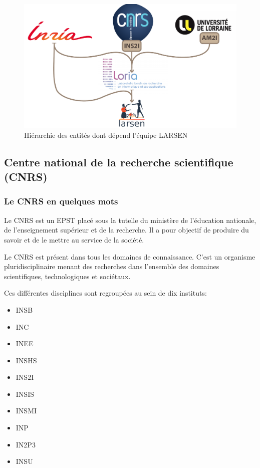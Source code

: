 \documentclass{tnreport}
\begin{document}
\begin{figure}[h]
    \centering
    \includegraphics[width = 15cm]{figures/orga_labos}
    \caption{Hiérarchie des entités dont dépend l'équipe \gls{LARSEN}}
    \label{fig:orgaLab}
\end{figure}

\subsection{Centre national de la recherche scientifique (CNRS)}
\subsubsection{Le CNRS en quelques mots}
Le \gls{CNRS} est un \gls{EPST} placé sous la tutelle du ministère de l'éducation nationale, de l'enseignement supérieur et de la recherche. Il a pour objectif de produire du savoir et de le mettre au service de la société. 

Le \gls{CNRS} est présent dans tous les domaines de connaissance. C'est un organisme pluridisciplinaire menant des recherches dans l'ensemble des domaines scientifiques, technologiques et sociétaux.

Ces différentes disciplines sont regroupées au sein de dix instituts:
\begin{itemize}
\item \gls{INSB}   
\item \gls{INC}
\item \gls{INEE}
\item \gls{INSHS}
\item \gls{INS2I}
\item \gls{INSIS}
\item \gls{INSMI}
\item \gls{INP}
\item \gls{IN2P3}
\item \gls{INSU}
\end{itemize}
\end{document}
